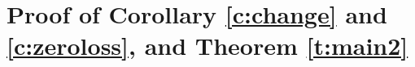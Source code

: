 \documentclass{article}
\numberwithin{equation}{section}
\newcommand{\fD}{{\frak D}}
\newcommand{\sfe}{{\mathsf e}}
\newcommand{\sfd}{{\mathsf d}}
\DeclareMathOperator{\diag}{diag}
\renewcommand{\leq}{\leqslant}
\newcommand{\cor}{\color{darkred}}
\newcommand{\1}{\mathds{1}}
\theoremstyle{plain} %
\begin{document}
%
%





\section{Proof of Corollary \ref{c:change} and \ref{c:zeroloss}, and Theorem \ref{t:main2}}\label{s:cproof}
\end{document}
